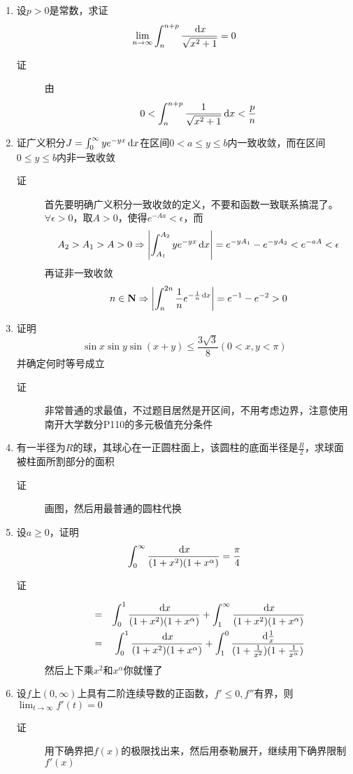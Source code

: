 \begin{enumerate}
\item 设$p>0$是常数，求证
\[
\lim_{n\to \infty}\int_n^{n+p} \frac{\,\mathrm{d} x}{\sqrt{x^2+1}} = 0
\]
\begin{description}
\item[证] 由
\[
0<\int_n^{n+p}\frac{1}{\sqrt{x^2+1}}\,\mathrm{d} x<\frac{p}{n}
\]
\end{description}
\item 证广义积分$J=\int_0^{\infty}ye^{-yx}\,\mathrm{d} x$在区间$0<a\leq y\leq b$内一致收敛，而在区间$0\leq y\leq b$内非一致收敛
\begin{description}
\item[证] 首先要明确广义积分一致收敛的定义，不要和函数一致联系搞混了。$\forall \epsilon>0$，取$A>0$，使得$e^{-Aa}<\epsilon$，而
\[
A_2>A_1>A>0\Rightarrow\left|\int_{A_1}^{A_2}ye^{-yx}\,\mathrm{d} x \right|=e^{-yA_1}-e^{-yA_2}<e^{-aA}<\epsilon
\]
再证非一致收敛
\[
n\in \mathbf{N}\Rightarrow\left|\int_n^{2n}\frac{1}{n}e^{-\frac{1}{n}\,\mathrm{d} x}\right|=e^{-1}-e^{-2}>0
\]
\end{description}

\item 证明
\[
\sin x\sin y \sin(x+y)\leq \frac{3\sqrt{3}}{8} (0<x,y<\pi)
\]
并确定何时等号成立
\begin{description}
\item[证] 非常普通的求最值，不过题目居然是开区间，不用考虑边界，注意使用南开大学数分P110的多元极值充分条件
\end{description}

\item 有一半径为$R$的球，其球心在一正圆柱面上，该圆柱的底面半径是$\frac{R}{2}$，求球面被柱面所割部分的面积
\begin{description}
\item[证] 画图，然后用最普通的圆柱代换
\end{description}

\item 设$a\geq 0$，证明
\[
\int_0^\infty \frac{\,\mathrm{d} x}{(1+x^2)(1+x^\alpha)} = \frac{\pi}{4}
\]
\begin{description}
\item[证]
\begin{eqnarray*}
&=&\int_0^1 \frac{\,\mathrm{d} x}{(1+x^2)(1+x^\alpha)}+\int_1^\infty \frac{\,\mathrm{d} x}{(1+x^2)(1+x^\alpha)}\\
&=&\int_0^1 \frac{\,\mathrm{d} x}{(1+x^2)(1+x^\alpha)}+\int_1^0 \frac{\,\mathrm{d} \frac{1}{x}}{(1+\frac{1}{x^2})(1+\frac{1}{x^\alpha})}
\end{eqnarray*}
然后上下乘$x^2$和$x^\alpha$你就懂了
\end{description}

\item 设$f$上$(0,\infty)$上具有二阶连续导数的正函数，$f'\leq 0,f''$有界，则$\lim_{t \to \infty}f'(t)=0$
\begin{description}
\item[证] 用下确界把$f(x)$的极限找出来，然后用泰勒展开，继续用下确界限制$f'(x)$
\end{description}



















\end{enumerate}